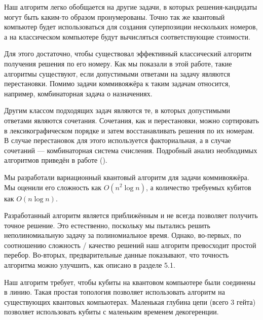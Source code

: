 Наш алгоритм легко обобщается на другие задачи, в которых решения-кандидаты могут быть каким-то образом пронумерованы. Точно так же квантовый компьютер будет использоваться для создания суперпозиции нескольких номеров, а на классическом компьютере будут вычисляться соответствующие стоимости.

Для этого достаточно, чтобы существовал эффективный классический алгоритм получения решения по его номеру. 
Как мы показали в этой работе, такие алгоритмы существуют, если допустимыми ответами на задачу являются перестановки. Помимо задачи коммивояжёра к таким задачам относится, например, комбинаторная задача о назначениях.

Другим классом подходящих задач являются те, в которых допустимыми ответами являются сочетания. Сочетания, как и перестановки, можно сортировать в лексикографическом порядке и затем восстанавливать решения по их номерам. В случае перестановок для этого используется факториальная, а в случае сочетаний --- комбинаторная система счисления.
Подробный анализ необходимых алгоритмов приведён в работе \cite{Combinations} (\citeyear{Combinations}).





Мы разработали вариационный квантовый алгоритм для задачи коммивояжёра. Мы оценили его сложность как $O(n^2 \log n)$, а количество требуемых кубитов как $O(n \log n)$.

Разработанный алгоритм является приближённым и не всегда позволяет получить точное решение. 
Это естественно, поскольку мы пытались решить неполиномиальную задачу за полиномиальное время. 
Однако, во-первых, по соотношению сложность / качество решений наш алгоритм превосходит простой перебор. 
Во-вторых, предварительные данные показывают, что точность алгоритма можно улучшить, как описано в разделе 5.1.

Наш алгоритм требует, чтобы кубиты на квантовом компьютере были соединены в линию. Такая простая топология позволяет использовать алгоритм на существующих квантовых компьютерах. Маленькая глубина цепи (всего 3 гейта) позволяет использовать кубиты с маленьким временем декогеренции. 

